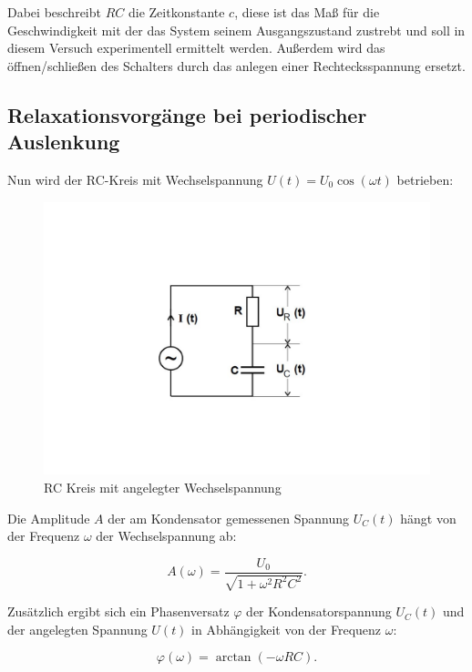 Dabei beschreibt $RC$ die Zeitkonstante $c$, diese ist das Maß für die Geschwindigkeit mit der das System seinem
Ausgangszustand zustrebt und soll in diesem Versuch experimentell ermittelt werden.
Außerdem wird das öffnen/schließen des Schalters durch das anlegen einer Rechtecksspannung ersetzt.

\subsection{Relaxationsvorgänge bei periodischer Auslenkung}
Nun wird der RC-Kreis mit Wechselspannung $U(t) = U_{0}\cos(\omega t)$ betrieben:
\begin{figure}
    \centering
    \includegraphics{content/Theorie - RC-Kreis Wechselspannung.pdf}
    \caption{RC Kreis mit angelegter Wechselspannung \cite{v353}}
    \label{fig:Theorie - RC_Kreis Wechselspannung}
\end{figure}

Die Amplitude $A$ der am Kondensator gemessenen Spannung $U_{C}(t)$ hängt von der Frequenz $\omega$ der Wechselspannung ab:

\begin{equation}
    A(\omega)= \frac{U_{0}}{\sqrt{1+\omega ^{2}R^{2}C^{2}}} . \label{eqn:Tiefpass}
\end{equation}

Zusätzlich ergibt sich ein Phasenversatz $\varphi$ der Kondensatorspannung $U_{C}(t)$ und der angelegten Spannung $U(t)$
in Abhängigkeit von der Frequenz $\omega$:

\begin{equation}
    \varphi (\omega )=\arctan (-\omega RC). \label{eqn:Phasenversatz}
\end{equation}

